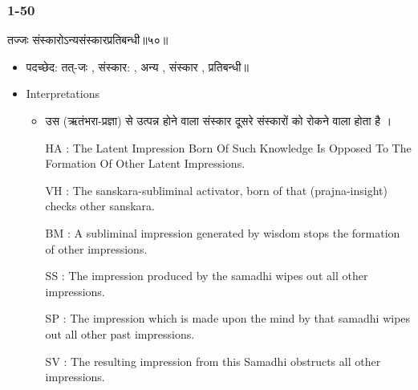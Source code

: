 \begin{frame}[fragile]\frametitle{1-50}
\begin{sanskrit}
तज्जः संस्कारोऽन्यसंस्कारप्रतिबन्धी॥५०॥
\end{sanskrit}

	\begin{itemize}
	\item पदच्छेद: तत्-जः , संस्कार: , अन्य , संस्कार , प्रतिबन्धी॥
	\item Interpretations
		\begin{itemize}
		\item उस (ऋतंभरा-प्रज्ञा) से उत्पन्न होने वाला संस्कार दूसरे संस्कारों को रोकने वाला होता है ।
		\item [HA]: The Latent Impression Born Of Such Knowledge Is Opposed To The Formation Of Other Latent Impressions.
		\item [VH]: The sanskara-subliminal activator, born of that (prajna-insight) checks other sanskara.
		\item [BM]: A subliminal impression generated by wisdom stops the formation of other impressions.
		\item [SS]: The impression produced by the samadhi wipes out all other impressions.
		\item [SP]: The impression which is made upon the mind by that samadhi wipes out all other past impressions.
		\item [SV]: The resulting impression from this Samadhi obstructs all other impressions. 
		\end{itemize}
	\end{itemize}
	
\end{frame}


